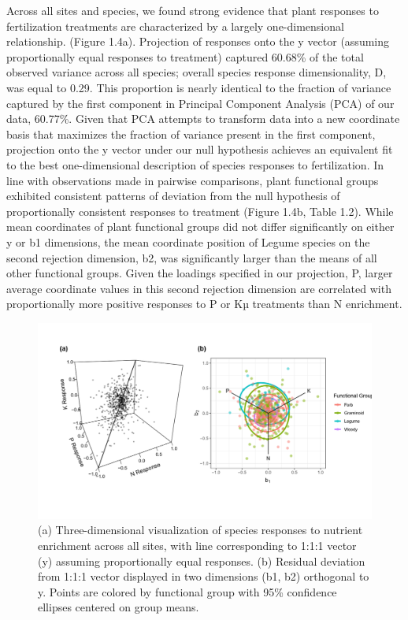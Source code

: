 \documentclass[twoside,12pt,final]{ucthesis-CA2012}
\begin{document}
\begin{ucmainmatter}
Across all sites and species, we found strong evidence that plant responses to fertilization treatments are characterized by a largely one-dimensional relationship. (Figure 1.4a). Projection of responses onto the y vector (assuming proportionally equal responses to treatment) captured 60.68\% of the total observed variance across all species; overall species response dimensionality, D, was equal to 0.29. This proportion is nearly identical to the fraction of variance captured by the first component in Principal Component Analysis (PCA) of our data, 60.77\%. Given that PCA attempts to transform data into a new coordinate basis that maximizes the fraction of variance present in the first component, projection onto the y vector under our null hypothesis achieves an equivalent fit to the best one-dimensional description of species responses to fertilization.
In line with observations made in pairwise comparisons, plant functional groups exhibited consistent patterns of deviation from the null hypothesis of proportionally consistent responses to treatment (Figure 1.4b, Table 1.2). While mean coordinates of plant functional groups did not differ significantly on either y or b1 dimensions, the mean coordinate position of Legume species on the second rejection dimension, b2, was significantly larger than the means of all other functional groups. Given the loadings specified in our projection, P, larger average coordinate values in this second rejection dimension are correlated with proportionally more positive responses to P or Kµ treatments than N enrichment.
\begin{figure}
\centering
\includegraphics[width=\textwidth,height=0.45\textheight]{figure/Fig1_4.png}
\caption{\newline (a) Three-dimensional visualization of species responses to nutrient enrichment across all sites, with line corresponding to 1:1:1 vector (y) assuming proportionally equal responses. \newline (b) Residual deviation from 1:1:1 vector displayed in two dimensions (b1, b2) orthogonal to y. Points are colored by functional group with 95\% confidence ellipses centered on group means. \label{fig-1-4}}

\end{figure}
\end{ucmainmatter}
\end{document}
